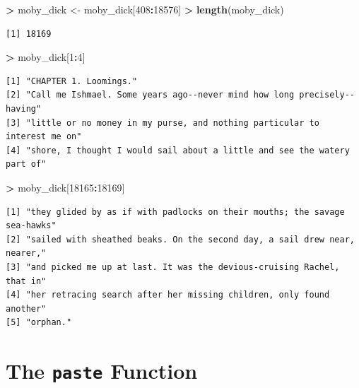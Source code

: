 \documentclass[]{krantz}
\makeatletter
\newenvironment{Shaded}{\begin{snugshade}}{\end{snugshade}}
\newcommand{\DecValTok}[1]{\textcolor[rgb]{0.06,0.06,0.06}{#1}}
\newcommand{\KeywordTok}[1]{\textcolor[rgb]{0.27,0.27,0.27}{\textbf{#1}}}
\newcommand{\NormalTok}[1]{#1}
\newcommand{\OperatorTok}[1]{\textcolor[rgb]{0.43,0.43,0.43}{\textbf{#1}}}
\newcommand{\StringTok}[1]{\textcolor[rgb]{0.5,0.5,0.5}{#1}}
\newenvironment{kframe}{%
\medskip{}
\setlength{\fboxsep}{.8em}
 \def\at@end@of@kframe{}%
 \ifinner\ifhmode%
  \def\at@end@of@kframe{\end{minipage}}%
  \begin{minipage}{\columnwidth}%
 \fi\fi%
 \def\FrameCommand##1{\hskip\@totalleftmargin \hskip-\fboxsep
 \colorbox{shadecolor}{##1}\hskip-\fboxsep
     \hskip-\linewidth \hskip-\@totalleftmargin \hskip\columnwidth}%
 \MakeFramed {\advance\hsize-\width
   \@totalleftmargin\z@ \linewidth\hsize
   \@setminipage}}%
 {\par\unskip\endMakeFramed%
 \at@end@of@kframe}
\renewenvironment{Shaded}{\begin{kframe}}{\end{kframe}}
\makeatother
\begin{document}
\begin{Shaded}
\begin{Highlighting}[]
\OperatorTok{>}\StringTok{ }\NormalTok{moby_dick <-}\StringTok{ }\NormalTok{moby_dick[}\DecValTok{408}\OperatorTok{:}\DecValTok{18576}\NormalTok{]}
\OperatorTok{>}\StringTok{ }\KeywordTok{length}\NormalTok{(moby_dick)}
\end{Highlighting}
\end{Shaded}

\begin{verbatim}
[1] 18169
\end{verbatim}

\begin{Shaded}
\begin{Highlighting}[]
\OperatorTok{>}\StringTok{ }\NormalTok{moby_dick[}\DecValTok{1}\OperatorTok{:}\DecValTok{4}\NormalTok{]}
\end{Highlighting}
\end{Shaded}

\begin{verbatim}
[1] "CHAPTER 1. Loomings."                                                    
[2] "Call me Ishmael. Some years ago--never mind how long precisely--having"  
[3] "little or no money in my purse, and nothing particular to interest me on"
[4] "shore, I thought I would sail about a little and see the watery part of" 
\end{verbatim}

\begin{Shaded}
\begin{Highlighting}[]
\OperatorTok{>}\StringTok{ }\NormalTok{moby_dick[}\DecValTok{18165}\OperatorTok{:}\DecValTok{18169}\NormalTok{]}
\end{Highlighting}
\end{Shaded}

\begin{verbatim}
[1] "they glided by as if with padlocks on their mouths; the savage sea-hawks"
[2] "sailed with sheathed beaks. On the second day, a sail drew near, nearer,"
[3] "and picked me up at last. It was the devious-cruising Rachel, that in"   
[4] "her retracing search after her missing children, only found another"     
[5] "orphan."                                                                 
\end{verbatim}

\hypertarget{the-paste-function}{%
\section{\texorpdfstring{The \texttt{paste} Function}{The paste Function}}\label{the-paste-function}}
\end{document}
